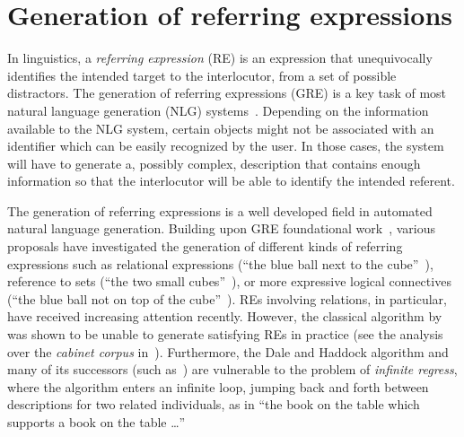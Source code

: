 \section{Generation of referring expressions}\label{sec:gre}

In linguistics, a \emph{referring expression} (RE) is an expression that 
unequivocally identifies the intended target to the interlocutor, from a set of possible distractors.
%  
%
The generation of referring expressions (GRE)  is a key task of most natural 
language generation (NLG) systems~\cite[Section 5.4]{dale2000}. 
Depending on the information available to the NLG system, certain objects might 
not be associated with an identifier which can be easily recognized by the user. 
In those cases, the system will have to generate a, possibly complex, description that contains 
enough information so that the interlocutor will be able to identify the intended referent.

The generation of referring expressions is a well developed field in automated natural language generation.
Building upon GRE foundational work~\cite{winograd,dale89cooking,Dale1995},
various proposals have investigated the generation of different kinds of referring expressions 
such as relational expressions (``the blue ball next to the cube''~\cite{dale91:_gener_refer_expres_invol_relat}),
reference to sets (``the two small cubes''~\cite{Stone2000}), or more expressive logical connectives (``the 
blue ball not on top of the cube''~\cite{deemter02:_gener_refer_expres}).
%
REs involving relations, in particular, have
received increasing attention recently.  However, the classical algorithm by~ was shown to be unable to generate satisfying REs in practice (see the 
analysis over the \emph{cabinet corpus} in~\cite{viethen06:_algor_for_gener_refer_expres}).  Furthermore, the Dale
and Haddock algorithm and many of its successors (such as~\cite{kelleher06:_increm_gener_of_spatial_refer}) are vulnerable to
the problem of \emph{infinite regress}, where the algorithm enters an infinite loop, jumping back
and forth between descriptions for two related individuals, as in ``the book on the table which supports a book on the
table \ldots''

